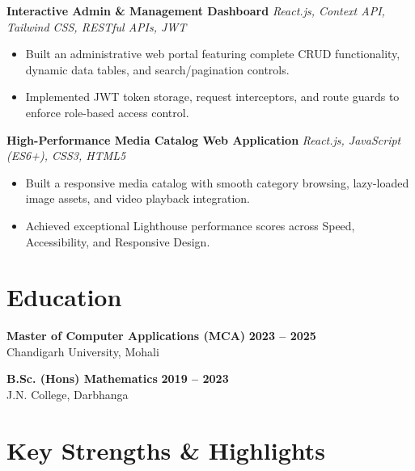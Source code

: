 \documentclass[a4paper,10pt]{article}
\begin{document}
\textbf{Interactive Admin \& Management Dashboard}
\hfill
\textit{React.js, Context API, Tailwind CSS, RESTful APIs, JWT}

\begin{itemize}

    \item Built an administrative web portal featuring complete CRUD functionality, dynamic data tables, and search/pagination controls.

    \item Implemented JWT token storage, request interceptors, and route guards to enforce role-based access control.

\end{itemize}


\textbf{High-Performance Media Catalog Web Application}
\hfill
\textit{React.js, JavaScript (ES6+), CSS3, HTML5}

\begin{itemize}

    \item Built a responsive media catalog with smooth category browsing, lazy-loaded image assets, and video playback integration.

    \item Achieved exceptional Lighthouse performance scores across Speed, Accessibility, and Responsive Design.

\end{itemize}

\section*{Education}

\textbf{Master of Computer Applications (MCA)}
\hfill
\textbf{2023 -- 2025}
\\
Chandigarh University, Mohali

\vspace{3pt}

\textbf{B.Sc. (Hons) Mathematics}
\hfill
\textbf{2019 -- 2023}
\\
J.N. College, Darbhanga

\section*{Key Strengths \& Highlights}
\end{document}
